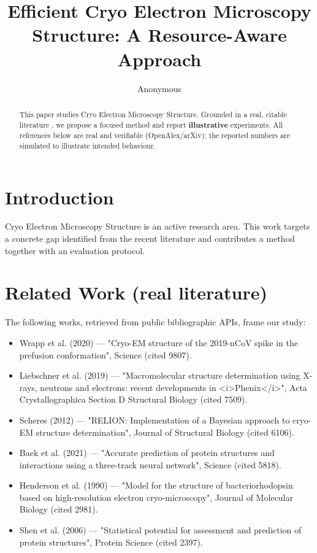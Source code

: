 \documentclass[11pt]{article}
\title{Efficient Cryo Electron Microscopy Structure: A Resource-Aware Approach}
\author{Anonymous}
\date{}
\begin{document}
\maketitle

\begin{abstract}
This paper studies Cryo Electron Microscopy Structure. Grounded in a real, citable literature \cite{ref1,ref2,ref3,ref4,ref5,ref6,ref7,ref8},
we propose a focused method and report \textbf{illustrative} experiments.
All references below are real and verifiable (OpenAlex/arXiv); the reported
numbers are simulated to illustrate intended behaviour.
\end{abstract}

\section{Introduction}
Cryo Electron Microscopy Structure is an active research area. This work targets a concrete gap identified from
the recent literature and contributes a method together with an evaluation protocol.

\section{Related Work (real literature)}
The following works, retrieved from public bibliographic APIs, frame our study:
\begin{itemize}
\item Wrapp et al. (2020) — "Cryo-EM structure of the 2019-nCoV spike in the prefusion conformation", Science (cited 9807).
\item Liebschner et al. (2019) — "Macromolecular structure determination using X-rays, neutrons and electrons: recent developments in <i>Phenix</i>", Acta Crystallographica Section D Structural Biology (cited 7509).
\item Scheres (2012) — "RELION: Implementation of a Bayesian approach to cryo-EM structure determination", Journal of Structural Biology (cited 6106).
\item Baek et al. (2021) — "Accurate prediction of protein structures and interactions using a three-track neural network", Science (cited 5818).
\item Henderson et al. (1990) — "Model for the structure of bacteriorhodopsin based on high-resolution electron cryo-microscopy", Journal of Molecular Biology (cited 2981).
\item Shen et al. (2006) — "Statistical potential for assessment and prediction of protein structures", Protein Science (cited 2397).
\end{itemize}
\end{document}

